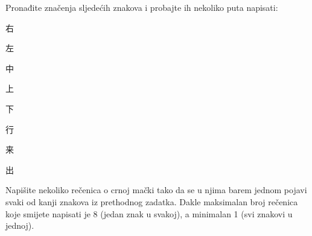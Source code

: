 
\author{Tomislav Mamić}

	
	\begin{mondai}{Pronađite značenja sljedećih znakova i probajte ih nekoliko puta napisati:}
		\item 右
		\item 左
		\item 中
		\item 上
		\item 下
		\item 行
		\item 来
		\item 出
	\end{mondai}

	\noindent Napišite nekoliko rečenica o crnoj mački tako da se u njima barem jednom pojavi svaki od kanji znakova iz prethodnog zadatka. Dakle maksimalan broj rečenica koje smijete napisati je 8 (jedan znak u svakoj), a minimalan 1 (svi znakovi u jednoj).
